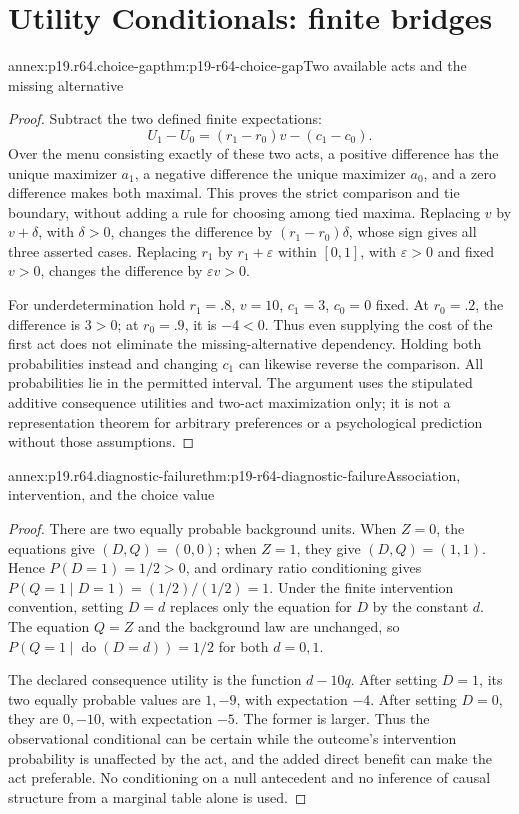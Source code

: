 \section{Utility Conditionals: finite bridges}
\label{sec:annex-p19-rationality-6-4}

\begin{annexitem}{annex:p19.r64.choice-gap}{thm:p19-r64-choice-gap}{Two available acts and the missing alternative}
\begin{proof}
Subtract the two defined finite expectations:
\[
 U_1-U_0=(r_1-r_0)v-(c_1-c_0).
\]
Over the menu consisting exactly of these two acts, a positive difference
has the unique maximizer \(a_1\), a negative difference the unique maximizer
\(a_0\), and a zero difference makes both maximal. This proves the
strict comparison and tie boundary, without adding a rule for choosing
among tied maxima. Replacing \(v\) by \(v+\delta\), with \(\delta>0\),
changes the difference by \((r_1-r_0)\delta\), whose sign gives all
three asserted cases. Replacing \(r_1\) by \(r_1+\varepsilon\) within
\([0,1]\), with \(\varepsilon>0\) and fixed \(v>0\), changes the
difference by \(\varepsilon v>0\).

For underdetermination hold \(r_1=.8\), \(v=10\), \(c_1=3\),
\(c_0=0\) fixed. At \(r_0=.2\), the difference is \(3>0\);
at \(r_0=.9\), it is \(-4<0\). Thus even supplying the cost of
the first act does not eliminate the missing-alternative dependency.
Holding both probabilities instead and changing \(c_1\) can likewise
reverse the comparison. All probabilities lie in the permitted interval.
The argument uses the stipulated additive consequence utilities and
two-act maximization only; it is not a representation theorem for arbitrary
preferences or a psychological prediction without those assumptions.
\end{proof}
\end{annexitem}

\begin{annexitem}{annex:p19.r64.diagnostic-failure}{thm:p19-r64-diagnostic-failure}{Association, intervention, and the choice value}
\begin{proof}
There are two equally probable background units. When \(Z=0\), the
equations give \((D,Q)=(0,0)\); when \(Z=1\), they give
\((D,Q)=(1,1)\). Hence \(P(D=1)=1/2>0\), and ordinary ratio
conditioning gives \(P(Q=1\mid D=1)=(1/2)/(1/2)=1\).
Under the finite intervention convention, setting \(D=d\) replaces only
the equation for \(D\) by the constant \(d\). The equation \(Q=Z\)
and the background law are unchanged, so \(P(Q=1\mid\operatorname{do}(D=d))
=1/2\) for both \(d=0,1\).

The declared consequence utility is the function \(d-10q\).
After setting \(D=1\), its two equally probable values are \(1,-9\),
with expectation \(-4\). After setting \(D=0\), they are \(0,-10\),
with expectation \(-5\). The former is larger. Thus the observational
conditional can be certain while the outcome's intervention probability
is unaffected by the act, and the added direct benefit can make the act
preferable. No conditioning on a null antecedent and no inference of
causal structure from a marginal table alone is used.
\end{proof}
\end{annexitem}
